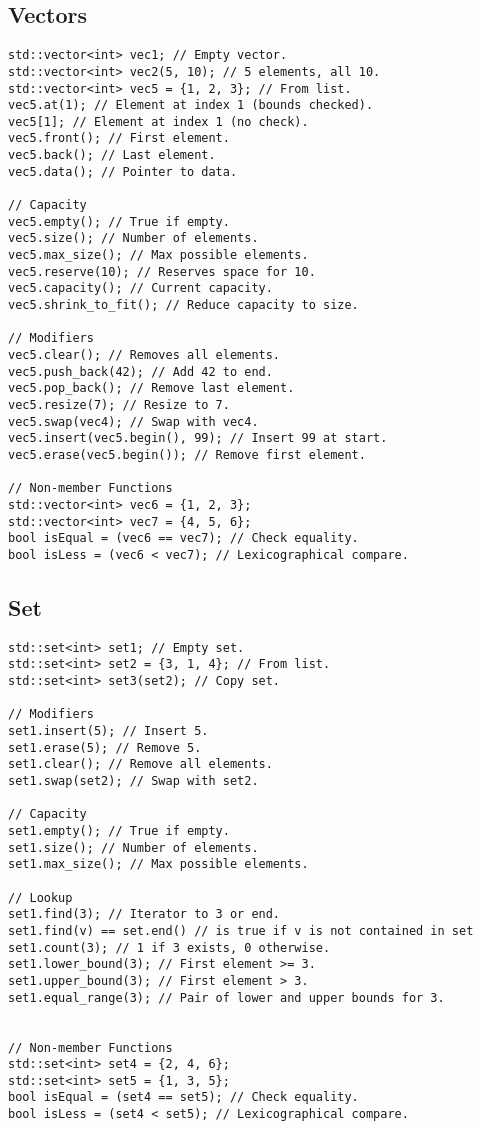 \subsection{Vectors}
\begin{lstlisting}[style=codeexpert]
std::vector<int> vec1; // Empty vector.
std::vector<int> vec2(5, 10); // 5 elements, all 10.
std::vector<int> vec5 = {1, 2, 3}; // From list.
vec5.at(1); // Element at index 1 (bounds checked).
vec5[1]; // Element at index 1 (no check).
vec5.front(); // First element.
vec5.back(); // Last element.
vec5.data(); // Pointer to data.

// Capacity
vec5.empty(); // True if empty.
vec5.size(); // Number of elements.
vec5.max_size(); // Max possible elements.
vec5.reserve(10); // Reserves space for 10.
vec5.capacity(); // Current capacity.
vec5.shrink_to_fit(); // Reduce capacity to size.

// Modifiers
vec5.clear(); // Removes all elements.
vec5.push_back(42); // Add 42 to end.
vec5.pop_back(); // Remove last element.
vec5.resize(7); // Resize to 7.
vec5.swap(vec4); // Swap with vec4.
vec5.insert(vec5.begin(), 99); // Insert 99 at start.
vec5.erase(vec5.begin()); // Remove first element.

// Non-member Functions
std::vector<int> vec6 = {1, 2, 3};
std::vector<int> vec7 = {4, 5, 6};
bool isEqual = (vec6 == vec7); // Check equality.
bool isLess = (vec6 < vec7); // Lexicographical compare.
\end{lstlisting}

\subsection{Set}

\begin{lstlisting}[style=codeexpert]
std::set<int> set1; // Empty set.
std::set<int> set2 = {3, 1, 4}; // From list.
std::set<int> set3(set2); // Copy set.

// Modifiers
set1.insert(5); // Insert 5.
set1.erase(5); // Remove 5.
set1.clear(); // Remove all elements.
set1.swap(set2); // Swap with set2.

// Capacity
set1.empty(); // True if empty.
set1.size(); // Number of elements.
set1.max_size(); // Max possible elements.

// Lookup
set1.find(3); // Iterator to 3 or end.
set1.find(v) == set.end() // is true if v is not contained in set
set1.count(3); // 1 if 3 exists, 0 otherwise.
set1.lower_bound(3); // First element >= 3.
set1.upper_bound(3); // First element > 3.
set1.equal_range(3); // Pair of lower and upper bounds for 3.


// Non-member Functions
std::set<int> set4 = {2, 4, 6};
std::set<int> set5 = {1, 3, 5};
bool isEqual = (set4 == set5); // Check equality.
bool isLess = (set4 < set5); // Lexicographical compare.
\end{lstlisting}



